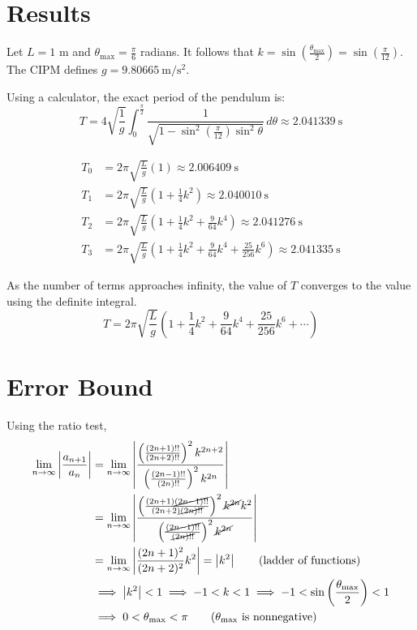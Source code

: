 \documentclass[12pt]{article}
\begin{document}
\section{Results}

Let $L = 1$ m and $\theta_{\mathrm{max}} = \frac{\pi}{6}$ radians. It follows that $k = \sin\left(\frac{\theta_{\mathrm{max}}}{2}\right) = \sin\left(\frac{\pi}{12}\right)$. The CIPM defines $g = \SI{9.80665}{\meter/\second\squared}$.

Using a calculator, the exact period of the pendulum is:
\[
  T = 4\sqrt{\frac{1}{g}} \int_{0}^{\frac{\pi}{2}} \frac{1}{\sqrt{1 - \sin^2\left(\frac{\pi}{12}\right) \sin^2 \theta}} \, d\theta \approx \boxed{\SI{2.041339}{\second}}
\]

\begin{align*}
  T_0 &= 2\pi \sqrt{\frac{L}{g}} \left(1\right) \approx \boxed{\SI{2.006409}{\second}} \\
  T_1 &= 2\pi \sqrt{\frac{L}{g}} \left(1 + \frac{1}{4}k^2\right) \approx \boxed{\SI{2.040010}{\second}} \\
  T_2 &= 2\pi \sqrt{\frac{L}{g}} \left(1 + \frac{1}{4}k^2 + \frac{9}{64}k^4\right) \approx \boxed{\SI{2.041276}{\second}} \\
  T_3 &= 2\pi \sqrt{\frac{L}{g}} \left(1 + \frac{1}{4}k^2 + \frac{9}{64}k^4 + \frac{25}{256}k^6\right) \approx \boxed{\SI{2.041335}{\second}}
\end{align*}

As the number of terms approaches infinity, the value of $T$ converges to the value using the definite integral.
\[
  T = 2\pi \sqrt{\frac{L}{g}} \left(1 + \frac{1}{4}k^2 + \frac{9}{64}k^4 + \frac{25}{256}k^6 + \cdots\right)
\]


\section{Error Bound}

Using the ratio test,
\begin{align*}
  \lim_{n \to \infty} \left|\frac{a_{n+1}}{a_n}\right| &= \lim_{n \to \infty} \left|\frac{\left(\frac{(2n+1)!!}{(2n+2)!!}\right)^2 k^{2n+2}}{\left(\frac{(2n-1)!!}{(2n)!!}\right)^2 k^{2n}}\right| \\
  &= \lim_{n \to \infty} \left|\frac{\left(\frac{(2n+1)\cancel{(2n-1)!!}}{(2n+2)\cancel{(2n)!!}}\right)^2 \cancel{k^{2n}}k^2}{\left(\frac{\cancel{(2n-1)!!}}{\cancel{(2n)!!}}\right)^2 \cancel{k^{2n}}}\right| \\
  &= \lim_{n \to \infty} \left|\frac{(2n+1)^2}{(2n+2)^2} k^2\right| = \left|k^2\right| \tag{\text{ladder of functions}} \\
  &\implies \left|k^2\right| < 1 \implies -1 < k < 1 \implies -1 < \sin\left(\frac{\theta_{\mathrm{max}}}{2}\right) < 1 \\
  &\implies 0 < \theta_{\mathrm{max}} < \pi \tag{\text{$\theta_{\mathrm{max}}$ is nonnegative}}
\end{align*}
\end{document}
